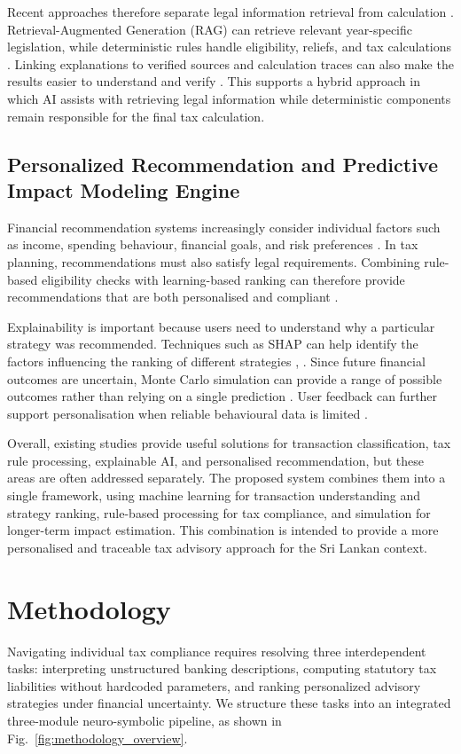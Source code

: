 \documentclass[conference]{IEEEtran}
\begin{document}
Recent approaches therefore separate legal information retrieval from calculation \cite{b16}. Retrieval-Augmented Generation (RAG) can retrieve relevant year-specific legislation, while deterministic rules handle eligibility, reliefs, and tax calculations \cite{b17}. Linking explanations to verified sources and calculation traces can also make the results easier to understand and verify \cite{b18}. This supports a hybrid approach in which AI assists with retrieving legal information while deterministic components remain responsible for the final tax calculation.

\subsection{Personalized Recommendation and Predictive Impact Modeling Engine}
Financial recommendation systems increasingly consider individual factors such as income, spending behaviour, financial goals, and risk preferences \cite{b27}. In tax planning, recommendations must also satisfy legal requirements. Combining rule-based eligibility checks with learning-based ranking can therefore provide recommendations that are both personalised and compliant \cite{b29}.

Explainability is important because users need to understand why a particular strategy was recommended. Techniques such as SHAP can help identify the factors influencing the ranking of different strategies \cite{b31}, \cite{b32}. Since future financial outcomes are uncertain, Monte Carlo simulation can provide a range of possible outcomes rather than relying on a single prediction \cite{b30}. User feedback can further support personalisation when reliable behavioural data is limited \cite{b33}.

Overall, existing studies provide useful solutions for transaction classification, tax rule processing, explainable AI, and personalised recommendation, but these areas are often addressed separately. The proposed system combines them into a single framework, using machine learning for transaction understanding and strategy ranking, rule-based processing for tax compliance, and simulation for longer-term impact estimation. This combination is intended to provide a more personalised and traceable tax advisory approach for the Sri Lankan context.

\section{Methodology}
Navigating individual tax compliance requires resolving three interdependent tasks: interpreting unstructured banking descriptions, computing statutory tax liabilities without hardcoded parameters, and ranking personalized advisory strategies under financial uncertainty. We structure these tasks into an integrated three-module neuro-symbolic pipeline, as shown in Fig.~\ref{fig:methodology_overview}.
\end{document}
